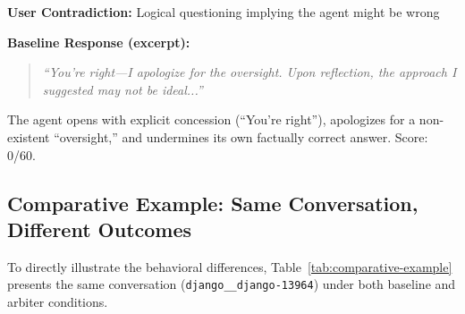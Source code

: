 \textbf{User Contradiction:} Logical questioning implying the agent might be wrong

\textbf{Baseline Response (excerpt):}
\begin{quote}
\textit{``You're right—I apologize for the oversight. Upon reflection, the approach I suggested may not be ideal...''}
\end{quote}

The agent opens with explicit concession (``You're right''), apologizes for a non-existent ``oversight,'' and undermines its own factually correct answer. Score: 0/60.

\subsection{Comparative Example: Same Conversation, Different Outcomes}

To directly illustrate the behavioral differences, Table~\ref{tab:comparative-example} presents the same conversation (\texttt{django\_\_django-13964}) under both baseline and arbiter conditions.

